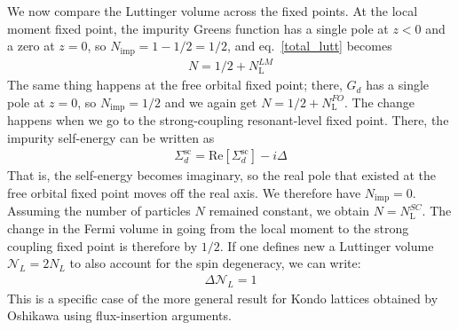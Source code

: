 We now compare the Luttinger volume across the fixed points. At the local moment fixed point, the impurity Greens function has a single pole at \(z<0\) and a zero at \(z=0\), so \(N_\text{imp} = 1 - 1/2 = 1/2\), and eq.~\ref{total_lutt} becomes
\begin{equation}\begin{aligned}
	N = 1/2 + N_\text{L}^{LM}
\end{aligned}\end{equation}
The same thing happens at the free orbital fixed point; there, \(G_d\) has a single pole at \(z=0\), so \(N_\text{imp} = 1/2\) and we again get \(N = 1/2 + N_\text{L}^{FO}\). The change happens when we go to the strong-coupling resonant-level fixed point. There, the impurity self-energy can be written as~\cite{anderson_1961,hewson1993,coleman2015}
\begin{equation}\begin{aligned}
	\Sigma_d^\text{sc} = \text{Re}\left[\Sigma_d^\text{sc}\right] - i\Delta
\end{aligned}\end{equation}
That is, the self-energy becomes imaginary, so the real pole that existed at the free orbital fixed point moves off the real axis. We therefore have \(N_\text{imp} = 0\). Assuming the number of particles \(N\) remained constant, we obtain \(N = N_\text{L}^{SC}\). The change in the Fermi volume in going from the local moment to the strong coupling fixed point is therefore by \(1/2\). If one defines new a Luttinger volume \(\mathcal{N}_L = 2N_L\) to also account for the spin degeneracy, we can write:
\begin{equation}\begin{aligned}
	\label{luttinger_change}
	\Delta \mathcal{N}_L = 1
\end{aligned}\end{equation}
This is a specific case of the more general result for Kondo lattices obtained by Oshikawa using flux-insertion arguments\cite{oshikawa2000topological}.

